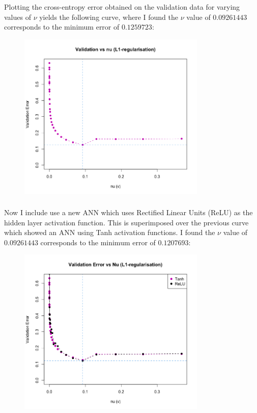 \documentclass[12pt]{article}
\begin{document}
\subsubsection{}

Plotting the cross-entropy error obtained on the validation data for varying values of $\nu$ yields the following curve, where I found the $\nu$ value of $0.09261443$ corresponds to the minimum error of $0.1259723$:

\begin{figure}[!ht]
\centering
\includegraphics[width=0.8\textwidth]{question_c_plot.png}
\end{figure}

\newpage
\subsubsection{}
Now I include use a new ANN which uses Rectified Linear Units (ReLU) as the hidden layer activation function. This is superimposed over the previous curve which showed an ANN using Tanh activation functions. I found the $\nu$ value of $0.09261443$ corresponds to the minimum error of $0.1207693$:

\begin{figure}[!ht]
\centering
\includegraphics[width=0.8\textwidth]{question_d_plot.png}
\end{figure}
\end{document}
